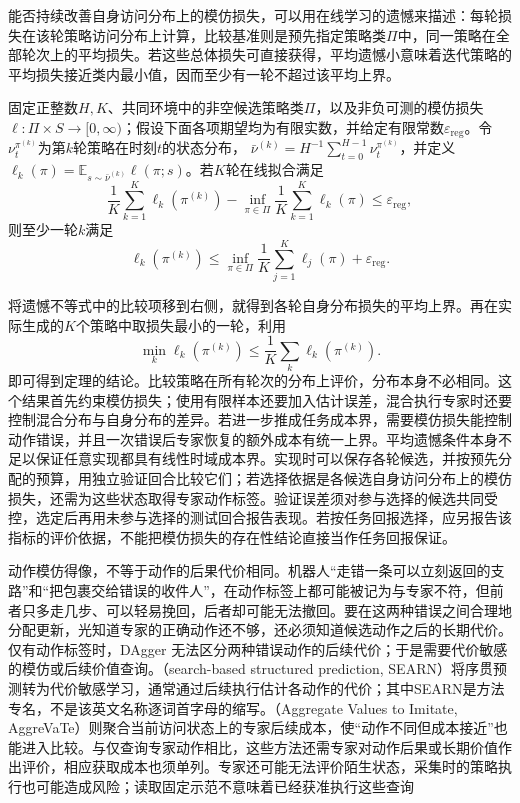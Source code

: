能否持续改善自身访问分布上的模仿损失，可以用在线学习的遗憾来描述：每轮损失在该轮策略访问分布上计算，比较基准则是预先指定策略类$\Pi$中，同一策略在全部轮次上的平均损失。若这些总体损失可直接获得，平均遗憾小意味着迭代策略的平均损失接近类内最小值，因而至少有一轮不超过该平均上界。

\begin{theorem}[理想化DAgger的无遗憾归约]
  \label{thm:rl-reward-dagger}
  固定正整数$H,K$、共同环境中的非空候选策略类$\Pi$，以及非负可测的模仿损失$\ell:\Pi\times S\to[0,\infty)$；假设下面各项期望均为有限实数，并给定有限常数$\varepsilon_{\mathrm{reg}}$。令$\nu_t^{\pi^{(k)}}$为第$k$轮策略在时刻$t$的状态分布，
  $\bar\nu^{(k)}=H^{-1}\sum_{t=0}^{H-1}\nu_t^{\pi^{(k)}}$，并定义
  $\ell_k(\pi)=\mathbb E_{s\sim\bar\nu^{(k)}}\ell(\pi;s)$。若$K$轮在线拟合满足
  \[
    \frac1K\sum_{k=1}^K\ell_k(\pi^{(k)})
    -\inf_{\pi\in\Pi}\frac1K\sum_{k=1}^K\ell_k(\pi)
    \leq\varepsilon_{\mathrm{reg}},
  \]
  则至少一轮$k$满足
  \[
    \ell_k(\pi^{(k)})
    \leq\inf_{\pi\in\Pi}\frac1K\sum_{j=1}^K\ell_j(\pi)
        +\varepsilon_{\mathrm{reg}}.
  \]
\end{theorem}

将遗憾不等式中的比较项移到右侧，就得到各轮自身分布损失的平均上界。再在实际生成的$K$个策略中取损失最小的一轮，利用
\[
  \min_k\ell_k(\pi^{(k)})
  \leq\frac1K\sum_k\ell_k(\pi^{(k)}).
\]
即可得到定理的结论。比较策略在所有轮次的分布上评价，分布本身不必相同。这个结果首先约束模仿损失；使用有限样本还要加入估计误差，混合执行专家时还要控制混合分布与自身分布的差异。若进一步推成任务成本界，需要模仿损失能控制动作错误，并且一次错误后专家恢复的额外成本有统一上界。平均遗憾条件本身不足以保证任意实现都具有线性时域成本界。实现时可以保存各轮候选，并按预先分配的预算，用独立验证回合比较它们；若选择依据是各候选自身访问分布上的模仿损失，还需为这些状态取得专家动作标签。验证误差须对参与选择的候选共同受控，选定后再用未参与选择的测试回合报告表现。若按任务回报选择，应另报告该指标的评价依据，不能把模仿损失的存在性结论直接当作任务回报保证。

动作模仿得像，不等于动作的后果代价相同。机器人“走错一条可以立刻返回的支路”和“把包裹交给错误的收件人”，在动作标签上都可能被记为与专家不符，但前者只多走几步、可以轻易挽回，后者却可能无法撤回。要在这两种错误之间合理地分配更新，光知道专家的正确动作还不够，还必须知道候选动作之后的长期代价。仅有动作标签时，DAgger 无法区分两种错误动作的后续代价；于是需要代价敏感的模仿或后续价值查询。（search-based structured prediction, SEARN）将序贯预测转为代价敏感学习，通常通过后续执行估计各动作的代价；其中SEARN是方法专名，不是该英文名称逐词首字母的缩写。（Aggregate Values to Imitate, AggreVaTe）则聚合当前访问状态上的专家后续成本，使“动作不同但成本接近”也能进入比较。与仅查询专家动作相比，这些方法还需专家对动作后果或长期价值作出评价，相应获取成本也须单列。专家还可能无法评价陌生状态，采集时的策略执行也可能造成风险；读取固定示范不意味着已经获准执行这些查询

